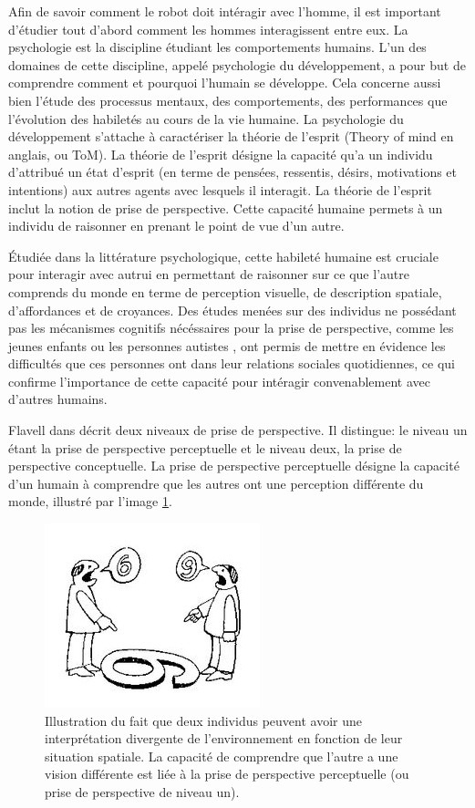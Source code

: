 \documentclass[a4paper,11pt,twoside]{StyleThese}
\begin{document}
Afin de savoir comment le robot doit intéragir avec l'homme, il est important d'étudier tout d'abord comment les hommes interagissent entre eux.
La psychologie est la discipline étudiant les comportements humains.
L'un des domaines de cette discipline, appelé psychologie du développement, a pour but de comprendre comment et pourquoi l'humain se développe. Cela concerne aussi bien l'étude des processus mentaux, des comportements, des performances que l'évolution des habiletés au cours de la vie humaine.
La psychologie du développement s'attache à caractériser la théorie de l'esprit (Theory of mind en anglais, ou ToM). La théorie de l'esprit désigne la capacité qu'a un individu d'attribué un état d'esprit (en terme de pensées, ressentis, désirs, motivations et intentions) aux autres agents avec lesquels il interagit. La théorie de l'esprit inclut la notion de prise de perspective. Cette capacité humaine permets à un individu de raisonner en prenant le point de vue d'un autre.

Étudiée dans la littérature psychologique\cite{Flavell1992,Tversky1999}, cette habileté humaine est cruciale pour interagir avec autrui en permettant de raisonner sur ce que l'autre comprends du monde en terme de perception visuelle, de description spatiale, d'affordances et de croyances.
Des études menées sur des individus ne possédant pas les mécanismes cognitifs nécéssaires pour la prise de perspective, comme les jeunes enfants ou les personnes autistes \cite{frick2014picturing}, ont permis de mettre en évidence les difficultés que ces personnes ont dans leur relations sociales quotidiennes, ce qui confirme l'importance de cette capacité pour intéragir convenablement avec d'autres humains.

Flavell dans \cite{flavell1977development} décrit deux niveaux de prise de perspective. Il distingue: le niveau un étant la prise de perspective perceptuelle et le niveau deux, la prise de perspective conceptuelle.
La prise de perspective perceptuelle désigne la capacité d'un humain à comprendre que les autres ont une perception différente du monde, illustré par l'image \ref{fig:perceptuel}.

\begin{figure}[ht!]
 \centering
  \includegraphics[width=0.49\linewidth]{./img/perceptuel.jpg} 
  \caption {Illustration du fait que deux individus peuvent avoir une interprétation divergente de l'environnement en fonction de leur situation spatiale. La capacité de comprendre que l'autre a une vision différente est liée à la prise de perspective perceptuelle (ou prise de perspective de niveau un).}
  \label{fig:perceptuel}
\end{figure}
\end{document}
